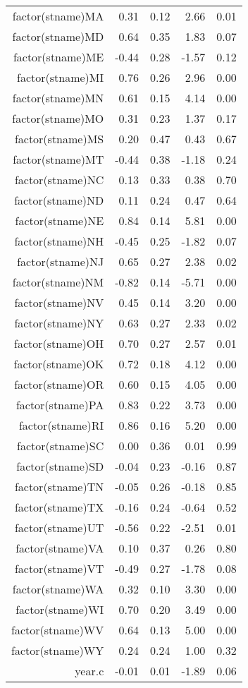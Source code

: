\begin{table}[ht]
\begin{tabular}{rrrrr}
  factor(stname)MA & 0.31 & 0.12 & 2.66 & 0.01 \\ 
  factor(stname)MD & 0.64 & 0.35 & 1.83 & 0.07 \\ 
  factor(stname)ME & -0.44 & 0.28 & -1.57 & 0.12 \\ 
  factor(stname)MI & 0.76 & 0.26 & 2.96 & 0.00 \\ 
  factor(stname)MN & 0.61 & 0.15 & 4.14 & 0.00 \\ 
  factor(stname)MO & 0.31 & 0.23 & 1.37 & 0.17 \\ 
  factor(stname)MS & 0.20 & 0.47 & 0.43 & 0.67 \\ 
  factor(stname)MT & -0.44 & 0.38 & -1.18 & 0.24 \\ 
  factor(stname)NC & 0.13 & 0.33 & 0.38 & 0.70 \\ 
  factor(stname)ND & 0.11 & 0.24 & 0.47 & 0.64 \\ 
  factor(stname)NE & 0.84 & 0.14 & 5.81 & 0.00 \\ 
  factor(stname)NH & -0.45 & 0.25 & -1.82 & 0.07 \\ 
  factor(stname)NJ & 0.65 & 0.27 & 2.38 & 0.02 \\ 
  factor(stname)NM & -0.82 & 0.14 & -5.71 & 0.00 \\ 
  factor(stname)NV & 0.45 & 0.14 & 3.20 & 0.00 \\ 
  factor(stname)NY & 0.63 & 0.27 & 2.33 & 0.02 \\ 
  factor(stname)OH & 0.70 & 0.27 & 2.57 & 0.01 \\ 
  factor(stname)OK & 0.72 & 0.18 & 4.12 & 0.00 \\ 
  factor(stname)OR & 0.60 & 0.15 & 4.05 & 0.00 \\ 
  factor(stname)PA & 0.83 & 0.22 & 3.73 & 0.00 \\ 
  factor(stname)RI & 0.86 & 0.16 & 5.20 & 0.00 \\ 
  factor(stname)SC & 0.00 & 0.36 & 0.01 & 0.99 \\ 
  factor(stname)SD & -0.04 & 0.23 & -0.16 & 0.87 \\ 
  factor(stname)TN & -0.05 & 0.26 & -0.18 & 0.85 \\ 
  factor(stname)TX & -0.16 & 0.24 & -0.64 & 0.52 \\ 
  factor(stname)UT & -0.56 & 0.22 & -2.51 & 0.01 \\ 
  factor(stname)VA & 0.10 & 0.37 & 0.26 & 0.80 \\ 
  factor(stname)VT & -0.49 & 0.27 & -1.78 & 0.08 \\ 
  factor(stname)WA & 0.32 & 0.10 & 3.30 & 0.00 \\ 
  factor(stname)WI & 0.70 & 0.20 & 3.49 & 0.00 \\ 
  factor(stname)WV & 0.64 & 0.13 & 5.00 & 0.00 \\ 
  factor(stname)WY & 0.24 & 0.24 & 1.00 & 0.32 \\ 
  year.c & -0.01 & 0.01 & -1.89 & 0.06 \\ 
   \hline
\end{tabular}
\end{table}
